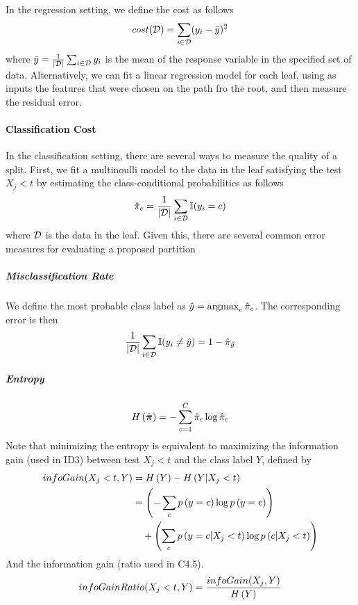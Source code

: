 In the regression setting, we define the cost as follows
\begin{align*}
	cost(\mathcal{D})=\sum_{i\in\mathcal{D}}(y_i-\bar{y})^2
\end{align*}
where $\bar{y}=\frac{1}{\left\vert\mathcal{D}\right\vert}\sum_{i\in\mathcal{D}}y_i$ is the mean of the response variable in the specified set of data. Alternatively, we can fit a linear regression model for each leaf, using as inputs the features that were chosen on the path fro the root, and then measure the residual error.

\paragraph{Classification Cost}

In the classification setting, there are several ways to measure the quality of a split. First, we fit a multinoulli model to the data in the leaf satisfying the test $X_j<t$ by estimating the class-conditional probabilities as follows
\begin{align*}
	\hat{\pi}_c=\frac{1}{\left\vert\mathcal{D}\right\vert}\sum_{i\in\mathcal{D}}\mathbb{I}(y_i=c)
\end{align*}
where $\mathcal{D}$ is the data in the leaf. Given this, there are several common error measures for evaluating a proposed partition

\subparagraph{Misclassification Rate}

We define the most probable class label as $\hat{y}=\argmax_c\hat{\pi}_c$. The corresponding error is then
\begin{align*}
	\frac{1}{\left\vert\mathcal{D}\right\vert}\sum_{i\in\mathcal{D}}\mathbb{I}(y_i\neq\hat{y})=1-\hat{\pi}_{\hat{y}}
\end{align*}

\subparagraph{Entropy}

\begin{align*}
	H\left(\hat{\boldsymbol{\pi}}\right)=-\sum_{c=1}^C\hat{\pi}_c\log\hat{\pi}_c
\end{align*}
Note that minimizing the entropy is equivalent to maximizing the information gain (used in ID3) between test $X_j<t$ and the class label $Y$, defined by
\begin{align*}
infoGain(X_j<t,Y)&=H\left(Y\right)-H\left(Y|X_j<t\right) \\
&=\left(-\sum_cp\left(y=c\right)\log p\left(y=c\right)\right) \\
&\quad+\left(\sum_cp\left(y=c|X_j<t\right)\log p\left(c|X_j<t\right)\right)
\end{align*}
And the information gain (ratio used in C4.5).
\begin{align*}
infoGainRatio(X_j<t,Y)=\frac{infoGain(X_j,Y)}{H\left(Y\right)}
\end{align*}


